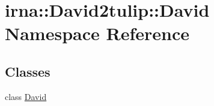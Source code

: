 \hypertarget{namespaceirna_1_1David2tulip_1_1David}{
\section{irna\-:\-:\-David2tulip\-:\-:\-David \-Namespace \-Reference}
\label{namespaceirna_1_1David2tulip_1_1David}
}
\subsection*{\-Classes}
\begin{DoxyCompactItemize}
\item 
class \hyperlink{classirna_1_1David2tulip_1_1David_1_1David}{\-David}
\end{DoxyCompactItemize}
